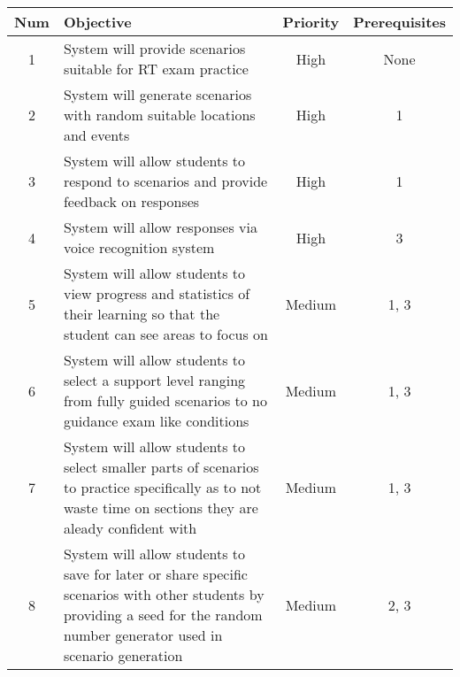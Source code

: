 \begin{center}
    \begin{tabular}{ | c | m{5em} | c | c | }
        \hline
        Num & Objective & Priority & Prerequisites \\
        \hline
        1 & System will provide scenarios suitable for RT exam practice & High & None \\
        \hline
        2 & System will generate scenarios with random suitable locations and events & High & 1 \\
        \hline
        3 & System will allow students to respond to scenarios and provide feedback on responses & High & 1 \\
        \hline
        4 & System will allow responses via voice recognition system & High & 3 \\
        \hline
        5 & System will allow students to view progress and statistics of their learning so that the student can see areas to focus on & Medium & 1, 3 \\
        \hline
        6 & System will allow students to select a support level ranging from fully guided scenarios to no guidance exam like conditions & Medium & 1, 3 \\
        \hline
        7 & System will allow students to select smaller parts of scenarios to practice specifically as to not waste time on sections they are aleady confident with & Medium & 1, 3 \\
        \hline
        8 & System will allow students to save for later or share specific scenarios with other students by providing a seed for the random number generator used in scenario generation & Medium & 2, 3 \\
        \hline
    \end{tabular}
\end{center}